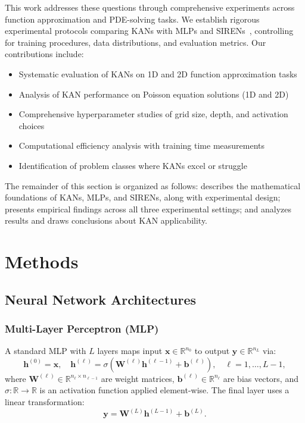 \documentclass[11pt,a4paper]{article}
\newcommand{\R}{\mathbb{R}}
\begin{document}
This work addresses these questions through comprehensive experiments across function approximation and PDE-solving tasks. We establish rigorous experimental protocols comparing KANs with MLPs and SIRENs~\citep{sitzmann2020implicit}, controlling for training procedures, data distributions, and evaluation metrics. Our contributions include:
\begin{itemize}
    \item Systematic evaluation of KANs on 1D and 2D function approximation tasks
    \item Analysis of KAN performance on Poisson equation solutions (1D and 2D)
    \item Comprehensive hyperparameter studies of grid size, depth, and activation choices
    \item Computational efficiency analysis with training time measurements
    \item Identification of problem classes where KANs excel or struggle
\end{itemize}

The remainder of this section is organized as follows:  describes the mathematical foundations of KANs, MLPs, and SIRENs, along with experimental design;  presents empirical findings across all three experimental settings; and  analyzes results and draws conclusions about KAN applicability.

\section{Methods}
\label{sec:methods}

\subsection{Neural Network Architectures}

\subsubsection{Multi-Layer Perceptron (MLP)}

A standard MLP with $L$ layers maps input $\mathbf{x} \in \R^{n_0}$ to output $\mathbf{y} \in \R^{n_L}$ via:
\begin{equation}
\mathbf{h}^{(0)} = \mathbf{x}, \quad \mathbf{h}^{(\ell)} = \sigma\left(\mathbf{W}^{(\ell)} \mathbf{h}^{(\ell-1)} + \mathbf{b}^{(\ell)}\right), \quad \ell = 1, \ldots, L-1,
\end{equation}
where $\mathbf{W}^{(\ell)} \in \R^{n_\ell \times n_{\ell-1}}$ are weight matrices, $\mathbf{b}^{(\ell)} \in \R^{n_\ell}$ are bias vectors, and $\sigma: \R \to \R$ is an activation function applied element-wise. The final layer uses a linear transformation:
\begin{equation}
\mathbf{y} = \mathbf{W}^{(L)} \mathbf{h}^{(L-1)} + \mathbf{b}^{(L)}.
\end{equation}
\end{document}

